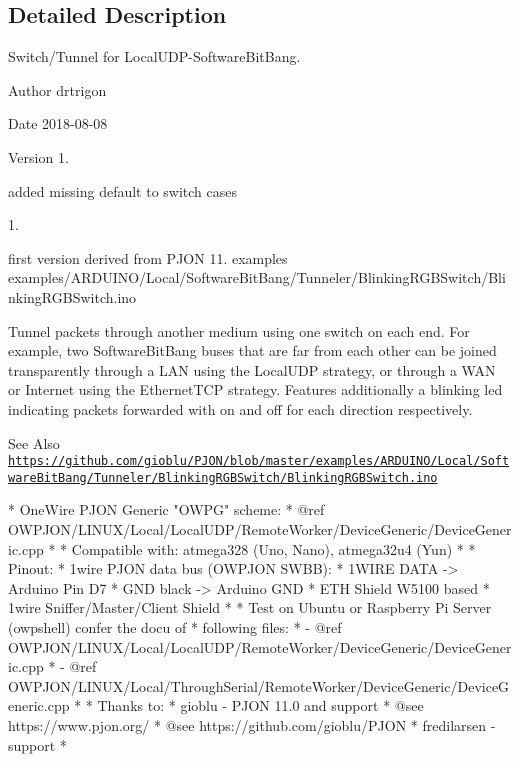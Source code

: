 \subsection{Detailed Description}
Switch/\-Tunnel for Local\-U\-D\-P-\/\-Software\-Bit\-Bang. \begin{DoxyAuthor}{Author}
drtrigon 
\end{DoxyAuthor}
\begin{DoxyDate}{Date}
2018-\/08-\/08 
\end{DoxyDate}
\begin{DoxyVersion}{Version}
1. \begin{DoxyItemize}
\item added missing default to switch cases \end{DoxyItemize}


1. \begin{DoxyItemize}
\item first version derived from P\-J\-O\-N 11. examples examples/\-A\-R\-D\-U\-I\-N\-O/\-Local/\-Software\-Bit\-Bang/\-Tunneler/\-Blinking\-R\-G\-B\-Switch/\-Blinking\-R\-G\-B\-Switch.\-ino\end{DoxyItemize}
Tunnel packets through another medium using one switch on each end. For example, two Software\-Bit\-Bang buses that are far from each other can be joined transparently through a L\-A\-N using the Local\-U\-D\-P strategy, or through a W\-A\-N or Internet using the Ethernet\-T\-C\-P strategy. Features additionally a blinking led indicating packets forwarded with on and off for each direction respectively.
\end{DoxyVersion}
\begin{DoxySeeAlso}{See Also}
\href{https://github.com/gioblu/PJON/blob/master/examples/ARDUINO/Local/SoftwareBitBang/Tunneler/BlinkingRGBSwitch/BlinkingRGBSwitch.ino}{\tt https\-://github.\-com/gioblu/\-P\-J\-O\-N/blob/master/examples/\-A\-R\-D\-U\-I\-N\-O/\-Local/\-Software\-Bit\-Bang/\-Tunneler/\-Blinking\-R\-G\-B\-Switch/\-Blinking\-R\-G\-B\-Switch.\-ino}
\end{DoxySeeAlso}
\begin{DoxyVerb}* OneWire PJON Generic "OWPG" scheme:
*   @ref OWPJON/LINUX/Local/LocalUDP/RemoteWorker/DeviceGeneric/DeviceGeneric.cpp
*
* Compatible with: atmega328 (Uno, Nano), atmega32u4 (Yun)
*
* Pinout:
*   1wire PJON data bus (OWPJON SWBB):
*        1WIRE DATA    -> Arduino Pin D7
*        GND black     -> Arduino GND
*   ETH Shield W5100 based
*   1wire Sniffer/Master/Client Shield
*
* Test on Ubuntu or Raspberry Pi Server (owpshell) confer the docu of
* following files:
*   - @ref OWPJON/LINUX/Local/LocalUDP/RemoteWorker/DeviceGeneric/DeviceGeneric.cpp
*   - @ref OWPJON/LINUX/Local/ThroughSerial/RemoteWorker/DeviceGeneric/DeviceGeneric.cpp
*
* Thanks to:
* gioblu - PJON 11.0 and support
*          @see https://www.pjon.org/
*          @see https://github.com/gioblu/PJON
* fredilarsen - support
* \end{DoxyVerb}
 

